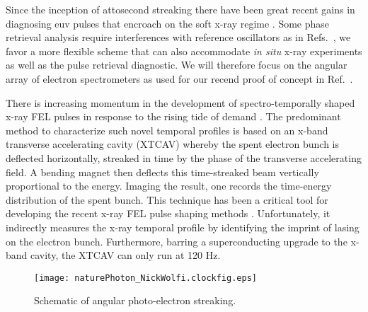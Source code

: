 


Since the inception of attosecond streaking \cite{Zenghu2005,KellerAngularStreaking} there have been great recent gains in diagnosing euv pulses that encroach on the soft x-ray regime \cite{Biegert2016,WornerSci2017,Worner2017}.
Some phase retrieval analysis require interferences with reference oscillators as in Refs.~\cite{Zenghu2010,Cocke2013}, we favor a more flexible scheme that can also accommodate \textit{in situ} x-ray experiments as well as the pulse retrieval diagnostic.
We will therefore focus on the angular array of electron spectrometers as used for our recend proof of concept in Ref.~\cite{Nick2018}.



There is increasing momentum in the development of spectro-temporally shaped x-ray FEL pulses \cite{eehg2009,Lutman13_twocolor,Marinelli13_twocolor,Allaria2014,Marinelli2015,Hemsing2016,Prince2016,Lutman2016,Marinelli2016} in response to the rising tide of demand \cite{Mukamel2007,Biggs2012,Mukamel2013,4WaveMixing,TIGER2015}.
The predominant method to characterize such novel temporal profiles is based on an x-band transverse accelerating cavity (XTCAV) \cite{xtcav2014} whereby the spent electron bunch is deflected horizontally, streaked in time by the phase of the transverse accelerating field.
A bending magnet then deflects this time-streaked beam vertically proportional to the energy.
Imaging the result, one records the time-energy distribution of the spent bunch.
This technique has been a critical tool for developing the recent x-ray FEL pulse shaping methods \cite{Marinelli2015,Marinelli2016}.
Unfortunately, it indirectly measures the x-ray temporal profile by identifying the imprint of lasing on the electron bunch.
Furthermore, barring a superconducting upgrade to the x-band cavity, the XTCAV can only run at 120 Hz.

\begin{wrapfigure}[10]{r}{.5\linewidth}
\vspace{-\baselineskip}
\centerline{
	\texttt{[image: naturePhoton\_NickWolfi.clockfig.eps]}
}
\vspace{-\baselineskip}
\caption{
	\label{streakingschematic} 
	Schematic of angular photo-electron streaking. \cite{Nick1028}
}
\end{wrapfigure}

